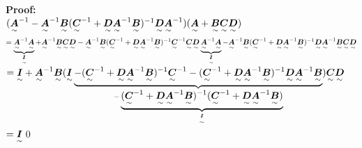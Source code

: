 \begin{doublespace}
\textbf{Proof:}\\
$(\ma{A}^{-1} - \ma{A}^{-1}\ma{B}(\ma{C}^{-1}+\ma{D}\ma{A}^{-1}\ma{B})^{-1}\ma{D}\ma{A}^{-1})(\ma{A}+\ma{B}\ma{C}\ma{D})$\\
$=\underbrace{\ma{A}^{-1}\ma{A}}_{\ma{I}} + \ma{A}^{-1}\ma{B}\ma{C}\ma{D} - \ma{A}^{-1}\ma{B}(\ma{C}^{-1}+\ma{D}\ma{A}^{-1}\ma{B})^{-1}\ma{C}^{-1}\ma{C}\ma{D}\underbrace{\ma{A}^{-1}\ma{A}}_{\ma{I}}-\ma{A}^{-1}\ma{B}(\ma{C}^{-1}+\ma{D}\ma{A}^{-1}\ma{B})^{-1}\ma{D}\ma{A}^{-1}\ma{B}\ma{C}\ma{D}$\\
$=\ma{I} + \ma{A}^{-1}\ma{B}(\ma{I}\underbrace{-(\ma{C}^{-1}+\ma{D}\ma{A}^{-1}\ma{B})^{-1}\ma{C}^{-1}-(\ma{C}^{-1}+\ma{D}\ma{A}^{-1}\ma{B})^{-1}\ma{D}\ma{A}^{-1}\ma{B}}_{-\underbrace{(\ma{C}^{-1}+\ma{D}\ma{A}^{-1}\ma{B})^{-1}(\ma{C}^{-1}+\ma{D}\ma{A}^{-1}\ma{B})}_{\ma{I}}})\ma{C}\ma{D}$\\
$=\ma{I}$\qed\\ \ \\


\end{doublespace}
